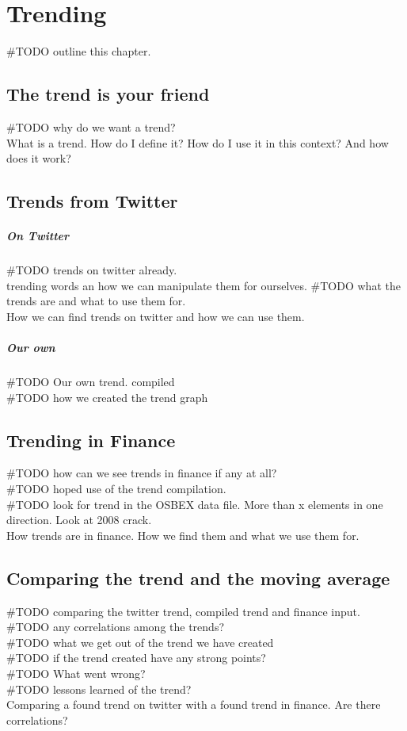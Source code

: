 \chapter{Trending}
#TODO outline this chapter.\\ 
%

\section{The trend is your friend}
#TODO why do we want a trend?\\
What is a trend. How do I define it? How do I use it in this context? And how
does it work? 
%

\section{Trends from Twitter}
\paragraph{On Twitter}
#TODO trends on twitter already.\\
trending words an how we can manipulate them for ourselves. 
#TODO what the trends are and what to use them for. \\
How we can find trends on twitter and how we can use them.

\paragraph{Our own}
#TODO Our own trend. compiled\\
#TODO how we created the trend graph\\
 
% 

\section{Trending in Finance}
#TODO how can we see trends in finance if any at all?\\
#TODO hoped use of the trend compilation. \\
#TODO look for trend in the OSBEX data file. More than x elements in one
direction. Look at 2008 crack.\\ 

How trends are in finance. How we find them and what we use them for. 
%

\section{Comparing the trend and the moving average}
#TODO comparing the twitter trend, compiled trend and finance input. \\
#TODO any correlations among the trends?\\
#TODO what we get out of the trend we have created\\
#TODO if the trend created have any strong points?\\
#TODO What went wrong?\\
#TODO lessons learned of the trend? \\
 
Comparing a found trend on twitter with a found trend in finance. Are there
correlations?   
%
